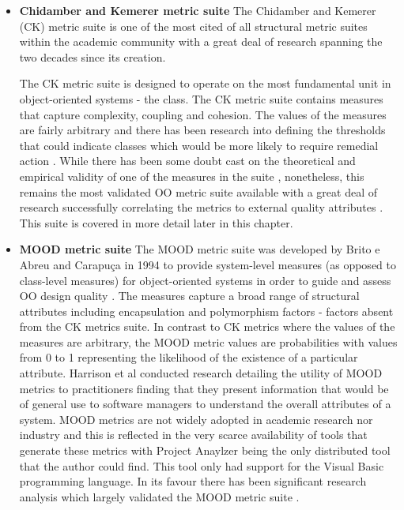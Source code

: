 \begin{itemize}
\item \textbf{Chidamber and Kemerer metric suite} The Chidamber and Kemerer (CK) metric suite is one of the most cited of all structural metric suites within the academic community \citep{pressman2005software} with a great deal of research spanning the two decades since its creation. 

The CK metric suite is designed to operate on the most fundamental unit in object-oriented systems - the class. The CK metric suite contains measures that capture complexity, coupling and cohesion. The values of the measures are fairly arbitrary and there has been research into defining the thresholds that could indicate classes which would be more likely to require remedial action \citep{rosenberg1998applying}. While there has been some doubt cast on the theoretical and empirical validity of one of the measures in the suite \citep{fenton2014software}, nonetheless, this remains the most validated OO metric suite available \citep{kitchenham2010s} with a great deal of research successfully correlating the metrics to external quality attributes \citep{rosenberg1998applying, el2001prediction} \citep{basili1984software, subramanyam2003empirical}. This suite is covered in more detail later in this chapter.

\item \textbf{MOOD metric suite} The MOOD metric suite was developed by Brito e Abreu and Carapu\c{c}a in 1994 to provide system-level measures (as opposed to class-level measures) for object-oriented systems in order to guide and assess OO design quality \citep{abreu1994object}. The measures capture a broad range of structural attributes including encapsulation and polymorphism factors - factors absent from the CK metrics suite. In contrast to CK metrics where the values of the measures are arbitrary, the MOOD metric values are probabilities with values from 0 to 1 representing the likelihood of the existence of a particular attribute. Harrison et al conducted research detailing the utility of MOOD metrics to practitioners \citep{harrison1998investigation} finding that they present information that would be of general use to software managers to understand the overall attributes of a system. MOOD metrics are not widely adopted in academic research nor industry and this is reflected in the very scarce availability of tools that generate these metrics with Project Anaylzer \citep{abounader1997data} being the only distributed tool that the author could find. This tool only had support for the Visual Basic programming language. In its favour there has been significant research analysis which largely validated the MOOD metric suite \citep{abounader1997data, harrison1998evaluation}.


\end{itemize}
